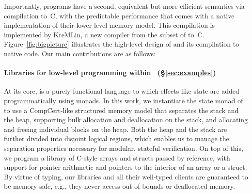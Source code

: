 Importantly, \lowstar programs have a second, equivalent but more efficient
semantics via compilation to~C, with the predictable
performance that comes with a native implementation of their
lower-level memory model. 
This compilation is implemented by KreMLin, a new
compiler from the \lowstar subset of \fstar to~C. 
Figure~\ref{fig:bigpicture} illustrates the high-level design of
\lowstar and its compilation to native code.
%
Our main contributions are as follows:



\paragraph*{Libraries for low-level programming within \fstar~(\S\ref{sec:examples})}
At its core, \fstar is a purely functional language
to which effects like state are added programmatically using monads.
%
In this work, we instantiate the state monad of \fstar to use a CompCert-like
structured memory model that separates the stack and the heap,
supporting bulk %
allocation and deallocation on the stack,
and allocating and freeing individual blocks %
on the heap.
%
Both the heap and the stack are further divided into disjoint logical
regions, which enables us to manage the separation properties
necessary for modular, stateful verification.
%
On top of this, we program a library of C-style arrays and structs passed by
reference, with support for pointer arithmetic and pointers to the interior of
an array or a struct.  
%
By virtue of \fstar typing, our libraries and all their well-typed
clients are guaranteed to be memory safe, e.g., they never access
out-of-bounds or deallocated memory.

